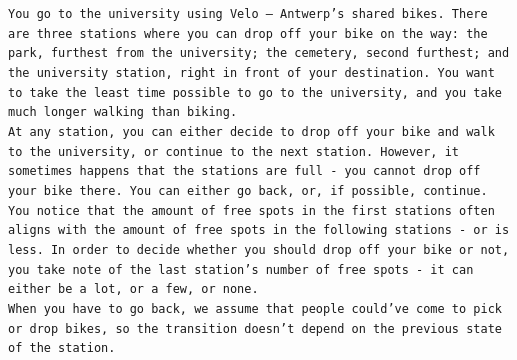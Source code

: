 \documentclass[a4paper]{article}
\begin{document}
\texttt{You go to the university using Velo -- Antwerp's shared bikes. There are three stations where you can drop off your bike on the way: the park, furthest from the university; the cemetery, second furthest; and the university station, right in front of your destination.
You want to take the least time possible to go to the university, and you take much longer walking than biking. \\
At any station, you can either decide to drop off your bike and walk to the university, or continue to the next station.
However, it sometimes happens that the stations are full - you cannot drop off your bike there. You can either go back, or, if possible, continue.\\
You notice that the amount of free spots in the first stations often aligns with the amount of free spots in the following stations - or is less. In order to decide whether you should drop off your bike or not, you take note of the last station's number of free spots - it can either be a lot, or a few, or none.\\
When you have to go back, we assume that people could've come to pick or drop bikes, so the transition doesn't depend on the previous state of the station.
}
\end{document}
